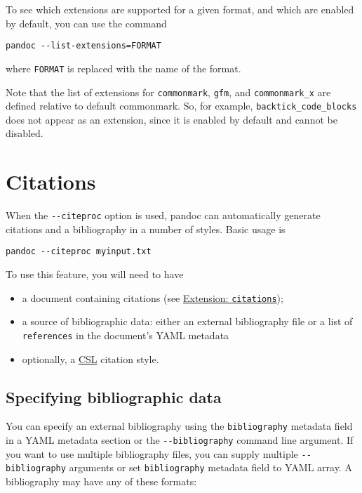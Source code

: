 \documentclass[]{article}
\providecommand{\tightlist}{%
  \setlength{\itemsep}{0pt}\setlength{\parskip}{0pt}}
\begin{document}
To see which extensions are supported for a given format, and which are
enabled by default, you can use the command

\begin{verbatim}
pandoc --list-extensions=FORMAT
\end{verbatim}

where \texttt{FORMAT} is replaced with the name of the format.

Note that the list of extensions for \texttt{commonmark}, \texttt{gfm},
and \texttt{commonmark\_x} are defined relative to default commonmark.
So, for example, \texttt{backtick\_code\_blocks} does not appear as an
extension, since it is enabled by default and cannot be disabled.

\hypertarget{citations}{%
\section{Citations}\label{citations}}

When the \texttt{-\/-citeproc} option is used, pandoc can automatically
generate citations and a bibliography in a number of styles. Basic usage
is

\begin{verbatim}
pandoc --citeproc myinput.txt
\end{verbatim}

To use this feature, you will need to have

\begin{itemize}
\tightlist
\item
  a document containing citations (see
  \protect\hyperlink{extension-citations}{Extension:
  \texttt{citations}});
\item
  a source of bibliographic data: either an external bibliography file
  or a list of \texttt{references} in the document's YAML metadata
\item
  optionally, a
  \href{https://docs.citationstyles.org/en/stable/specification.html}{CSL}
  citation style.
\end{itemize}

\hypertarget{specifying-bibliographic-data}{%
\subsection{Specifying bibliographic
data}\label{specifying-bibliographic-data}}

You can specify an external bibliography using the \texttt{bibliography}
metadata field in a YAML metadata section or the
\texttt{-\/-bibliography} command line argument. If you want to use
multiple bibliography files, you can supply multiple
\texttt{-\/-bibliography} arguments or set \texttt{bibliography}
metadata field to YAML array. A bibliography may have any of these
formats:
\end{document}
